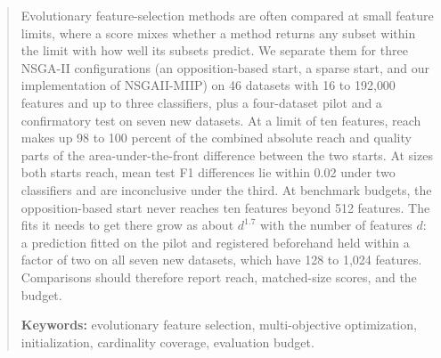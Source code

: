 
\begin{abstract}
Evolutionary feature-selection methods are often compared at small feature limits, where a score mixes whether a method returns any subset within the limit with how well its subsets predict. We separate them for three NSGA-II configurations (an opposition-based start, a sparse start, and our implementation of NSGAII-MIIP) on 46 datasets with 16 to 192{,}000 features and up to three classifiers, plus a four-dataset pilot and a confirmatory test on seven new datasets. At a limit of ten features, reach makes up 98 to 100 percent of the combined absolute reach and quality parts of the area-under-the-front difference between the two starts. At sizes both starts reach, mean test F1 differences lie within 0.02 under two classifiers and are inconclusive under the third. At benchmark budgets, the opposition-based start never reaches ten features beyond 512 features. The fits it needs to get there grow as about $d^{1.7}$ with the number of features $d$: a prediction fitted on the pilot and registered beforehand held within a factor of two on all seven new datasets, which have 128 to 1{,}024 features. Comparisons should therefore report reach, matched-size scores, and the budget.

\vspace{6pt}\textbf{Keywords:} evolutionary feature selection, multi-objective optimization, initialization, cardinality coverage, evaluation budget.
\end{abstract}
